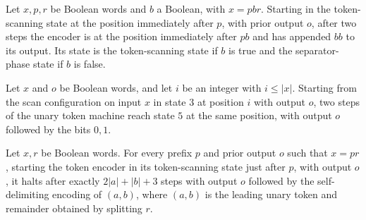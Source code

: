 \begin{lemma}
\label{Turing.FinTM.emitterToken_double}
\leanok
{}
Let $x,p,r$ be Boolean words and $b$ a Boolean, with $x=pbr$. Starting in the
token-scanning state at the position immediately after $p$, with prior output $o$, after
two steps the encoder is at the position immediately after $pb$ and has appended $bb$ to
its output. Its state is the token-scanning state if $b$ is true and the separator-phase
state if $b$ is false.
\end{lemma}

\begin{lemma}
\label{Turing.FinTM.emitterToken_separator}
\leanok
{}
Let $x$ and $o$ be Boolean words, and let $i$ be an integer with $i\le |x|$. Starting
from the scan configuration on input $x$ in state $3$ at position $i$ with output $o$,
two steps of the unary token machine reach state $5$ at the same position, with output
$o$ followed by the bits $0,1$.
\end{lemma}

\begin{lemma}
\label{Turing.FinTM.emitterToken_run}
\leanok
{}
Let $x,r$ be Boolean words. For every prefix $p$ and prior output $o$ such that $x=pr$,
starting the token encoder in its token-scanning state just after $p$, with output $o$,
it halts after exactly $2|a|+|b|+3$ steps with output $o$ followed by the
self-delimiting encoding of $(a,b)$, where $(a,b)$ is the leading unary token and
remainder obtained by splitting $r$.
\end{lemma}

